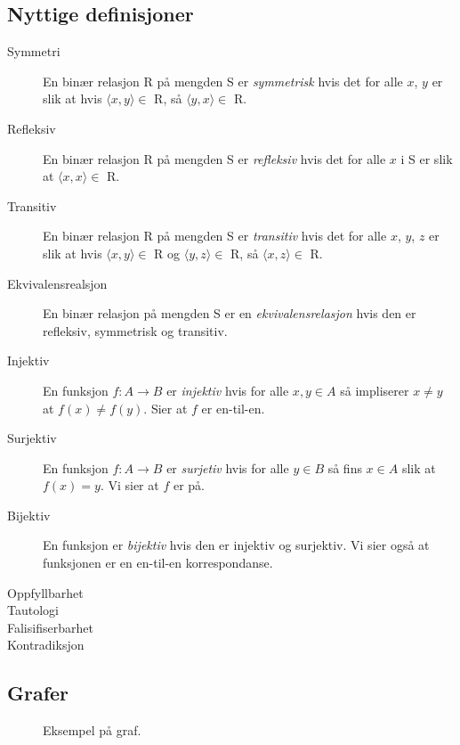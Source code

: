 \documentclass[11pt,a4paper]{article}
\begin{document}
\subsection{Nyttige definisjoner}
\begin{description}
\item[Symmetri] En binær relasjon R på mengden S er \textit{symmetrisk} hvis det for alle $x$, $y$ er slik at hvis $\langle x, y \rangle \in$ R, så $\langle y, x \rangle \in$ R.
\item[Refleksiv] En binær relasjon R på mengden S er \textit{refleksiv} hvis det for alle $x$ i S er slik at $\langle x, x \rangle \in$ R.
\item[Transitiv] En binær relasjon R på mengden S er \textit{transitiv} hvis det for alle $x$, $y$, $z$ er slik at hvis $\langle x, y \rangle \in $ R og $\langle y, z \rangle \in $ R, så $\langle x, z \rangle \in$ R.
\item[Ekvivalensrealsjon] En binær relasjon på mengden S er en \textit{ekvivalensrelasjon} hvis den er refleksiv, symmetrisk og transitiv.
\item[Injektiv] En funksjon $f : A \rightarrow B$ er \textit{injektiv} hvis for alle $x, y \in A$ så impliserer $x \neq y$ at $f(x) \neq f(y)$. Sier at $f$ er en-til-en.
\item[Surjektiv] En funksjon $f : A \rightarrow B$ er \textit{surjetiv} hvis for alle $y \in B$ så fins $x \in A$ slik at $f(x) = y$. Vi sier at $f$ er på.
\item[Bijektiv] En funksjon er \textit{bijektiv} hvis den er injektiv og surjektiv. Vi sier også at funksjonen er en en-til-en korrespondanse.
\item[Oppfyllbarhet] 
\item[Tautologi]
\item[Falisifiserbarhet] 
\item[Kontradiksjon]
\end{description}
\subsection{Grafer}
 \begin{figure}[h!]
 \centering
 \scalebox{0.7}
 {
 }
 \caption{Eksempel på graf.}
 \end{figure}
\end{document}
